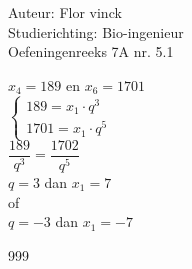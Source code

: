 \documentclass[a4paper]{article}
\begin{document}
\noindent \large Auteur: Flor vinck \\
\noindent \large Studierichting: Bio-ingenieur \\
\noindent \large Oefeningenreeks 7A nr. 5.1 \\

\medskip

\normalsize
$x_4=189$ en $x_6=1701$\\

$\left\{
	\begin{array}{l}
		189= x_1 \cdot q^3\\
		1701= x_1 \cdot q^5
	\end{array}
	\right.$\\ 

$\dfrac{189}{q^3}= \dfrac{1702}{q^5}$\\

$q = 3$ dan $x_1 = 7$\\

of\\

$q= -3$ dan $x_1 = -7$\\



\begin{thebibliography}{999}
\end{thebibliography}
\end{document}
